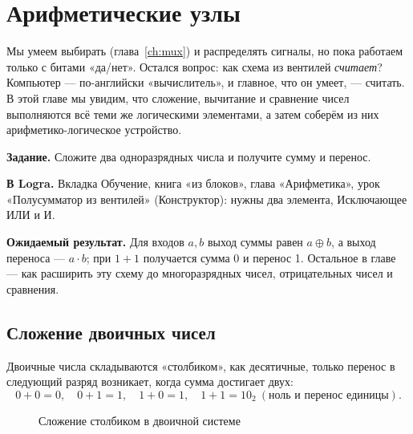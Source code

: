 \chapter{Арифметические узлы}
\label{ch:arith}

Мы умеем выбирать (глава~\ref{ch:mux}) и распределять сигналы, но пока
работаем только с битами «да/нет». Остался вопрос: как схема из вентилей
\emph{считает}? Компьютер --- по-английски «вычислитель», и главное, что он
умеет, --- считать. В этой главе мы увидим, что сложение, вычитание и сравнение
чисел выполняются всё теми же логическими элементами, а затем соберём из них
арифметико-логическое устройство.

\begin{buildbox}
\textbf{Задание.} Сложите два одноразрядных числа и получите сумму и перенос.

\textbf{В Logra.} Вкладка Обучение, книга «из блоков», глава
«Арифметика», урок «Полусумматор из вентилей» (Конструктор): нужны два элемента,
Исключающее ИЛИ и И.

\textbf{Ожидаемый результат.} Для входов $a,b$ выход суммы равен $a\oplus b$, а
выход переноса --- $a\cdot b$; при $1+1$ получается сумма 0 и перенос 1. Остальное
в главе --- как расширить эту схему до многоразрядных чисел, отрицательных
чисел и сравнения.
\end{buildbox}

\section{Сложение двоичных чисел}

Двоичные числа складываются «столбиком», как десятичные, только перенос в
следующий разряд возникает, когда сумма достигает двух:
\[
  0+0 = 0, \quad 0+1 = 1, \quad 1+0 = 1, \quad 1+1 = 10_2 \ (\text{ноль и перенос единицы}).
\]

\begin{figure}[H]
\centering
{}
\caption{Сложение столбиком в двоичной системе}
\end{figure}

